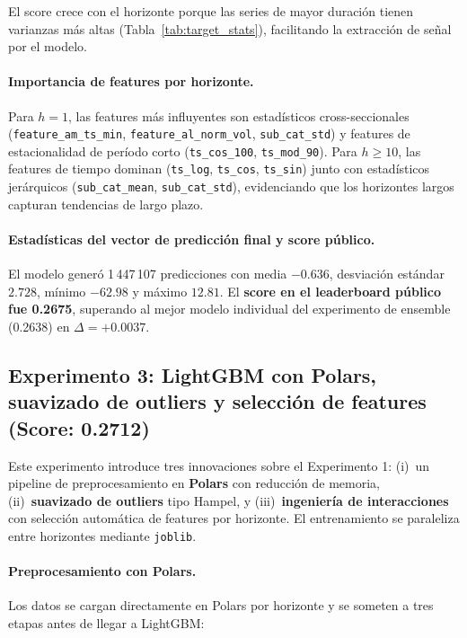 \documentclass{article}
\begin{document}
El score crece con el horizonte porque las series de mayor duración tienen varianzas más altas (Tabla~\ref{tab:target_stats}), facilitando la extracción de señal por el modelo.

\paragraph{Importancia de features por horizonte.}
Para $h=1$, las features más influyentes son estadísticos cross-seccionales (\texttt{feature\_am\_ts\_min}, \texttt{feature\_al\_norm\_vol}, \texttt{sub\_cat\_std}) y features de estacionalidad de período corto (\texttt{ts\_cos\_100}, \texttt{ts\_mod\_90}). Para $h \geq 10$, las features de tiempo dominan (\texttt{ts\_log}, \texttt{ts\_cos}, \texttt{ts\_sin}) junto con estadísticos jerárquicos (\texttt{sub\_cat\_mean}, \texttt{sub\_cat\_std}), evidenciando que los horizontes largos capturan tendencias de largo plazo.

\paragraph{Estadísticas del vector de predicción final y score público.}
El modelo generó 1\,447\,107 predicciones con media $-0.636$, desviación estándar $2.728$, mínimo $-62.98$ y máximo $12.81$. El \textbf{score en el leaderboard público fue 0.2675}, superando al mejor modelo individual del experimento de ensemble (0.2638) en $\Delta = +0.0037$.

\subsection{Experimento 3: LightGBM con Polars, suavizado de outliers y selección de features (Score: 0.2712)}

Este experimento introduce tres innovaciones sobre el Experimento 1: (i)~un pipeline de preprocesamiento en \textbf{Polars} con reducción de memoria, (ii)~\textbf{suavizado de outliers} tipo Hampel, y (iii)~\textbf{ingeniería de interacciones} con selección automática de features por horizonte. El entrenamiento se paraleliza entre horizontes mediante \texttt{joblib}.

\paragraph{Preprocesamiento con Polars.}
Los datos se cargan directamente en Polars por horizonte y se someten a tres etapas antes de llegar a LightGBM:
\end{document}
